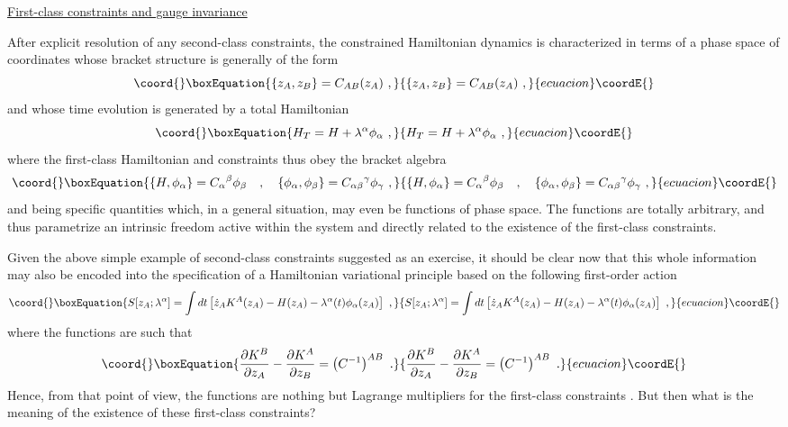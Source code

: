 \documentclass[a4paper,11pt]{article}
\begin{document}
\noindent\underline{First-class constraints and gauge invariance}

\vspace{5pt}

After explicit resolution of any second-class constraints, the constrained
Hamiltonian dynamics is characterized in terms of a phase space of coordinates
\coordHE{} whose bracket structure is generally of the form
\begin{equation}\coord{}\boxEquation{
\{z_A,z_B\}=C_{AB}(z_A)\ ,
}{
\{z_A,z_B\}=C_{AB}(z_A)\ ,
}{ecuacion}\coordE{}\end{equation}
and whose time evolution is generated by a total Hamiltonian
\begin{equation}\coord{}\boxEquation{
H_T=H+\lambda^\alpha\phi_\alpha\ ,
}{
H_T=H+\lambda^\alpha\phi_\alpha\ ,
}{ecuacion}\coordE{}\end{equation}
where the first-class Hamiltonian \coordHE{} and constraints \myHighlight{$\phi_\alpha$}\coordHE{} thus obey
the bracket algebra
\begin{equation}\coord{}\boxEquation{
\{H,\phi_\alpha\}={C_\alpha}^\beta\phi_\beta\ \ \ ,\ \ \ 
\{\phi_\alpha,\phi_\beta\}={C_{\alpha\beta}}^\gamma\phi_\gamma\ ,
\label{eq:gaugealgebra}
}{
\{H,\phi_\alpha\}={C_\alpha}^\beta\phi_\beta\ \ \ ,\ \ \ 
\{\phi_\alpha,\phi_\beta\}={C_{\alpha\beta}}^\gamma\phi_\gamma\ ,
}{ecuacion}\coordE{}\end{equation}
\myHighlight{${C_\alpha}^\beta$}\coordHE{} and \coordHE{} being specific quantities
which, in a general situation, may even be functions of phase space.
The functions \myHighlight{$\lambda^\alpha(t)$}\coordHE{} are totally arbitrary,
and thus parametrize an intrinsic freedom active within the system and
directly related to the existence of the first-class constraints.

Given the above simple example of second-class constraints suggested as
an exercise, it should
be clear now that this whole information may also be encoded into the
specification of a Hamiltonian variational principle based on the following
first-order action
\begin{equation}\coord{}\boxEquation{
S[z_A;\lambda^\alpha]=\int dt\left[\dot{z}_AK^A(z_A)-H(z_A)-
\lambda^\alpha(t)\phi_\alpha(z_A)\right]\ ,
\label{eq:HS}
}{
S[z_A;\lambda^\alpha]=\int dt\left[\dot{z}_AK^A(z_A)-H(z_A)-
\lambda^\alpha(t)\phi_\alpha(z_A)\right]\ ,
}{ecuacion}\coordE{}\end{equation}
where the functions \myHighlight{$K^A(z_A)$}\coordHE{} are such that
\begin{equation}\coord{}\boxEquation{
\frac{\partial K^B}{\partial z_A}-\frac{\partial K^A}{\partial z_B}=
\left(C^{-1}\right)^{AB}\ .
}{
\frac{\partial K^B}{\partial z_A}-\frac{\partial K^A}{\partial z_B}=
\left(C^{-1}\right)^{AB}\ .
}{ecuacion}\coordE{}\end{equation}
Hence, from that point of view, the functions \coordHE{} are nothing
but Lagrange multipliers for the first-class constraints \coordHE{}.
But then what is the meaning of the existence of these first-class constraints?
\end{document}
